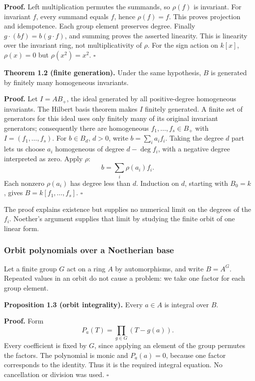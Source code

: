 \documentclass[
]{article}
\begin{document}
\textbf{Proof.} Left multiplication permutes the summands, so
\(\rho(f)\) is invariant. For invariant \(f\), every summand equals
\(f\), hence \(\rho(f)=f\). This proves projection and idempotence. Each
group element preserves degree. Finally \(g\cdot(bf)=b(g\cdot f)\), and
summing proves the asserted linearity. This is linearity over the
invariant ring, not multiplicativity of \(\rho\). For the sign action on
\(k [x]\), \(\rho(x)=0\) but \(\rho(x^2)=x^2\). \(\square\)

\protect{}\label{theorem-1-2}{}

\textbf{Theorem 1.2 (finite generation).} Under the same hypothesis,
\(B\) is generated by finitely many homogeneous invariants.

\textbf{Proof.} Let \(I=AB_+\), the ideal generated by all
positive-degree homogeneous invariants. The Hilbert basis theorem makes
\(I\) finitely generated. A finite set of generators for this ideal uses
only finitely many of its original invariant generators; consequently
there are homogeneous \(f_1,\ldots,f_s\in B_+\) with
\(I=(f_1,\ldots,f_s)\). For \(b\in B_d\), \(d>0\), write
\(b=\sum_i a_i f_i\). Taking the degree \(d\) part lets us choose
\(a_i\) homogeneous of degree \(d-\deg f_i\), with a negative degree
interpreted as zero. Apply \(\rho\): \[
b=\sum_i\rho(a_i)f_i.
\] Each nonzero \(\rho(a_i)\) has degree less than \(d\). Induction on
\(d\), starting with \(B_0=k\), gives \(B=k [f_1,\ldots,f_s]\).
\(\square\)

The proof explains existence but supplies no numerical limit on the
degrees of the \(f_i\). Noether's argument supplies that limit by
studying the finite orbit of one linear form.

\subsubsection{Orbit polynomials over a Noetherian
base}\label{orbit-polynomials-over-a-noetherian-base}

Let a finite group \(G\) act on a ring \(A\) by automorphisms, and write
\(B=A^G\). Repeated values in an orbit do not cause a problem: we take
one factor for each group element.

\protect{}\label{proposition-1-3}{}

\textbf{Proposition 1.3 (orbit integrality).} Every \(a\in A\) is
integral over \(B\).

\textbf{Proof.} Form \[
P_a(T)=\prod_{g\in G}(T-g(a)).
\] Every coefficient is fixed by \(G\), since applying an element of the
group permutes the factors. The polynomial is monic and \(P_a(a)=0\),
because one factor corresponds to the identity. Thus it is the required
integral equation. No cancellation or division was used. \(\square\)
\end{document}
